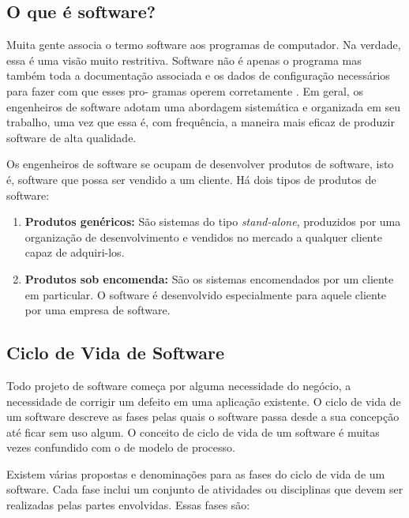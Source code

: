 \subsection{O que é software?}

Muita gente associa o termo software aos programas de computador. Na verdade, essa é uma visão muito restritiva. Software não é apenas o programa mas também toda a documentação associada e os dados de configuração necessários para fazer com que esses pro- gramas operem corretamente \cite{sommerville2003engenharia}. Em geral, os engenheiros de software adotam uma abordagem sistemática e organizada em seu trabalho, uma vez que essa é, com frequência, a maneira mais eficaz de produzir software de alta qualidade.

Os engenheiros de software se ocupam de desenvolver produtos de software, isto é, software que possa ser vendido a um cliente. Há dois tipos de produtos de software:

\begin{enumerate}
	\item \textbf{Produtos genéricos:} São sistemas do tipo \textit{stand-alone}, produzidos por uma organização de desenvolvimento e vendidos no mercado a qualquer cliente capaz de adquiri-los. 
	\item \textbf{Produtos sob encomenda:} São os sistemas encomendados por um cliente em particular. O software é desenvolvido especialmente para aquele cliente por uma empresa de software.
\end{enumerate}

\subsection{Ciclo de Vida de Software}

Todo projeto de software começa por alguma necessidade do negócio, a necessidade de corrigir um defeito em uma aplicação existente. O ciclo de vida de um software descreve as fases pelas quais o software passa desde a sua concepção até ficar sem uso algum. O conceito de ciclo de vida de um software é muitas vezes confundido com o de modelo de processo.

Existem várias propostas e denominações para as fases do ciclo de vida de um software. Cada fase inclui um conjunto de atividades ou disciplinas que devem ser realizadas pelas partes envolvidas. Essas fases são:

